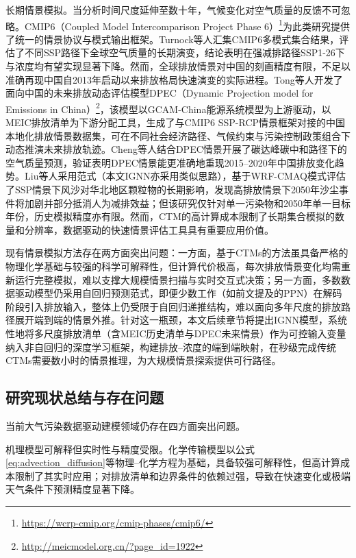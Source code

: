 长期情景模拟。当分析时间尺度延伸至数十年，气候变化对空气质量的反馈不可忽略。CMIP6（Coupled Model Intercomparison Project Phase 6）\footnote{\url{https://wcrp-cmip.org/cmip-phases/cmip6/}}为此类研究提供了统一的情景协议与模式输出框架\citep{eyring2016overview}。Turnock等人\citep{turnock2020historical}汇集CMIP6多模式集合结果，评估了不同SSP路径下全球空气质量的长期演变，结论表明在强减排路径SSP1-26下\ozone{}与\PM{}浓度均有望实现显著下降。然而，全球排放情景对中国的刻画精度有限，不足以准确再现中国自2013年启动以来排放格局快速演变的实际进程。Tong等人\citep{tong2020dynamic}开发了面向中国的未来排放动态评估模型DPEC（Dynamic Projection model for Emissions in China）\footnote{\url{http://meicmodel.org.cn/?page_id=1922}}，该模型以GCAM-China能源系统模型为上游驱动，以MEIC排放清单为下游分配工具，生成了与CMIP6 SSP-RCP情景框架对接的中国本地化排放情景数据集，可在不同社会经济路径、气候约束与污染控制政策组合下动态推演未来排放轨迹。Cheng等人\citep{cheng2021pathways}结合DPEC情景开展了碳达峰碳中和路径下的空气质量预测，验证表明DPEC情景能更准确地重现2015--2020年中国排放变化趋势。Liu等人\citep{liu2021wind}采用范式（本文IGNN亦采用类似思路），基于WRF-CMAQ模式评估了SSP情景下风沙对华北地区颗粒物的长期影响，发现高排放情景下2050年沙尘事件将加剧并部分抵消人为减排效益；但该研究仅针对\PMten{}单一污染物和2050年单一目标年份，历史模拟精度亦有限。然而，CTM的高计算成本限制了长期集合模拟的数量和分辨率，数据驱动的快速情景评估工具具有重要应用价值。

现有情景模拟方法存在两方面突出问题：一方面，基于CTMs的方法虽具备严格的物理化学基础与较强的科学可解释性，但计算代价极高，每次排放情景变化均需重新运行完整模拟，难以支撑大规模情景扫描与实时交互式决策；另一方面，多数数据驱动模型仍采用自回归预测范式，即便少数工作（如前文提及的PPN\citep{qiu2023regional}）在解码阶段引入排放输入，整体上仍受限于自回归递推结构，难以面向多年尺度的排放路径展开端到端的情景外推。针对这一瓶颈，本文后续章节将提出IGNN模型，系统性地将多尺度排放清单（含MEIC历史清单与DPEC未来情景）作为可控输入变量纳入非自回归的深度学习框架，构建排放--浓度的端到端映射，在秒级完成传统CTMs需要数小时的情景推理，为大规模情景探索提供可行路径。

\subsection{研究现状总结与存在问题}
\label{subsec:summary}

当前大气污染数据驱动建模领域仍存在四方面突出问题。

机理模型可解释但实时性与精度受限。化学传输模型以公式\eqref{eq:advection_diffusion}等物理--化学方程为基础，具备较强可解释性，但高计算成本限制了其实时应用；对排放清单和边界条件的依赖过强，导致在快速变化或极端天气条件下预测精度显著下降。

